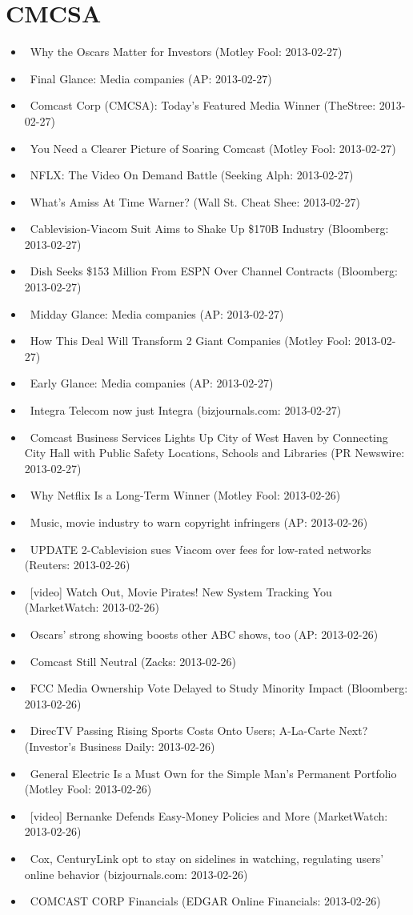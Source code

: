 \documentclass[11pt,asymmetric]{article}
\begin{document}
\section*{CMCSA}
\begin{itemize}
\item\ Why the Oscars Matter for Investors (Motley Fool: 2013-02-27)
\item\ Final Glance: Media companies (AP: 2013-02-27)
\item\ Comcast Corp (CMCSA): Today's Featured Media Winner (TheStree: 2013-02-27)
\item\ You Need a Clearer Picture of Soaring Comcast (Motley Fool: 2013-02-27)
\item\ NFLX: The Video On Demand Battle (Seeking Alph: 2013-02-27)
\item\ What’s Amiss At Time Warner? (Wall St. Cheat Shee: 2013-02-27)
\item\ Cablevision-Viacom Suit Aims to Shake Up \$170B Industry (Bloomberg: 2013-02-27)
\item\ Dish Seeks \$153 Million From ESPN Over Channel Contracts (Bloomberg: 2013-02-27)
\item\ Midday Glance: Media companies (AP: 2013-02-27)
\item\ How This Deal Will Transform 2 Giant Companies (Motley Fool: 2013-02-27)
\item\ Early Glance: Media companies (AP: 2013-02-27)
\item\ Integra Telecom now just Integra (bizjournals.com: 2013-02-27)
\item\ Comcast Business Services Lights Up City of West Haven by Connecting City Hall with Public Safety Locations, Schools and Libraries (PR Newswire: 2013-02-27)
\item\ Why Netflix Is a Long-Term Winner (Motley Fool: 2013-02-26)
\item\ Music, movie industry to warn copyright infringers (AP: 2013-02-26)
\item\ UPDATE 2-Cablevision sues Viacom over fees for low-rated networks (Reuters: 2013-02-26)
\item\ [video] Watch Out, Movie Pirates! New System Tracking You (MarketWatch: 2013-02-26)
\item\ Oscars' strong showing boosts other ABC shows, too (AP: 2013-02-26)
\item\ Comcast Still Neutral (Zacks: 2013-02-26)
\item\ FCC Media Ownership Vote Delayed to Study Minority Impact (Bloomberg: 2013-02-26)
\item\ DirecTV Passing Rising Sports Costs Onto Users; A-La-Carte Next? (Investor's Business Daily: 2013-02-26)
\item\ General Electric Is a Must Own for the Simple Man's Permanent Portfolio (Motley Fool: 2013-02-26)
\item\ [video] Bernanke Defends Easy-Money Policies and More (MarketWatch: 2013-02-26)
\item\ Cox, CenturyLink opt to stay on sidelines in watching, regulating users’ online behavior (bizjournals.com: 2013-02-26)
\item\ COMCAST CORP Financials (EDGAR Online Financials: 2013-02-26)
\end{itemize}
\end{document}
